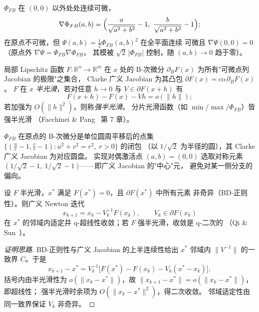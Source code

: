 \begin{proposition}[FB 的光滑性结构]\label{sec:pf-th-glob-prop-fbsmooth}
$\Phi_{FB}$ 在 $(0,0)$ 以外处处连续可微，
\begin{equation}
\nabla\Phi_{FB}(a,b)=\Bigl(\frac{a}{\sqrt{a^2+b^2}}-1,\
\frac{b}{\sqrt{a^2+b^2}}-1\Bigr);
\end{equation}
在原点不可微，但 $\Psi(a,b)=\tfrac12\Phi_{FB}(a,b)^2$ 在全平面连续
可微且 $\nabla\Psi(0,0)=0$（原点外 $\nabla\Psi=\Phi_{FB}\nabla\Phi_{FB}$，
其模被 $\sqrt2\,|\Phi_{FB}|$ 控制，随 $(a,b)\to0$ 趋于零）。
\end{proposition}

\begin{definition}\label{sec:pf-th-glob-def-clarke}
局部 Lipschitz 函数 $F:\mathbb R^n\to\mathbb R^m$ 在 $x$ 处的
B-次微分 $\partial_B F(x)$ 为所有"可微点列 Jacobian 的极限"之集合，
Clarke 广义 Jacobian 为其凸包
$\partial F(x)=\mathrm{co}\,\partial_B F(x)$。
$F$ 在 $x$ \emph{半光滑}，若对任意 $h\to0$ 与
$V\in\partial F(x+h)$ 有
\begin{equation}
F(x+h)-F(x)-Vh=o(\lVert h\rVert);
\end{equation}
若加强为 $O(\lVert h\rVert^2)$，则称\emph{强半光滑}。
分片光滑函数（如 $\min/\max/\Phi_{FB}$）皆强半光滑
（Facchinei \& Pang~\cite{pfglob-fp} 第 7 章）。
\end{definition}

\begin{example}\label{sec:pf-th-glob-ex-fb}
$\Phi_{FB}$ 在原点的 B-次微分是单位圆周平移后的点集
$\{(\frac{u}{r}-1,\frac{v}{r}-1):u^2+v^2=r^2,\ r>0\}$ 的闭包
（以 $1/\sqrt2$ 为半径的圆），其 Clarke 广义 Jacobian 为对应圆盘。
实现对偶激活点 $(a,b)=(0,0)$ 选取对称元素
$(1/\sqrt2-1,\ 1/\sqrt2-1)$——即广义 Jacobian 的"中心"元，
避免对某一侧分支的偏向。
\end{example}

\begin{theorem}\label{sec:pf-th-glob-thm-qisun}
设 $F$ 半光滑，$x^*$ 满足 $F(x^*)=0$，且 $\partial F(x^*)$ 中所有元素
非奇异（BD-正则性）。则广义 Newton 迭代
\begin{equation}
x_{k+1}=x_k-V_k^{-1}F(x_k),\qquad V_k\in\partial F(x_k)
\end{equation}
在 $x^*$ 的邻域内适定并 q-超线性收敛；若 $F$ 强半光滑，收敛是 q-二次的
（Qi \& Sun~\cite{pfglob-qisun}）。
\end{theorem}

\begin{proof}[证明思路]
BD-正则性与广义 Jacobian 的上半连续性给出 $x^*$ 邻域内
$\lVert V^{-1}\rVert$ 的一致界 $C$。于是
\[
x_{k+1}-x^*=V_k^{-1}\bigl[F(x^*)-F(x_k)-V_k(x^*-x_k)\bigr],
\]
括号内由半光滑性为 $o(\lVert x_k-x^*\rVert)$，故
$\lVert x_{k+1}-x^*\rVert=o(\lVert x_k-x^*\rVert)$，即超线性；
强半光滑时余项为 $O(\lVert x_k-x^*\rVert^2)$，得二次收敛。
邻域适定性由同一致界保证 $V_k$ 非奇异。
\end{proof}

